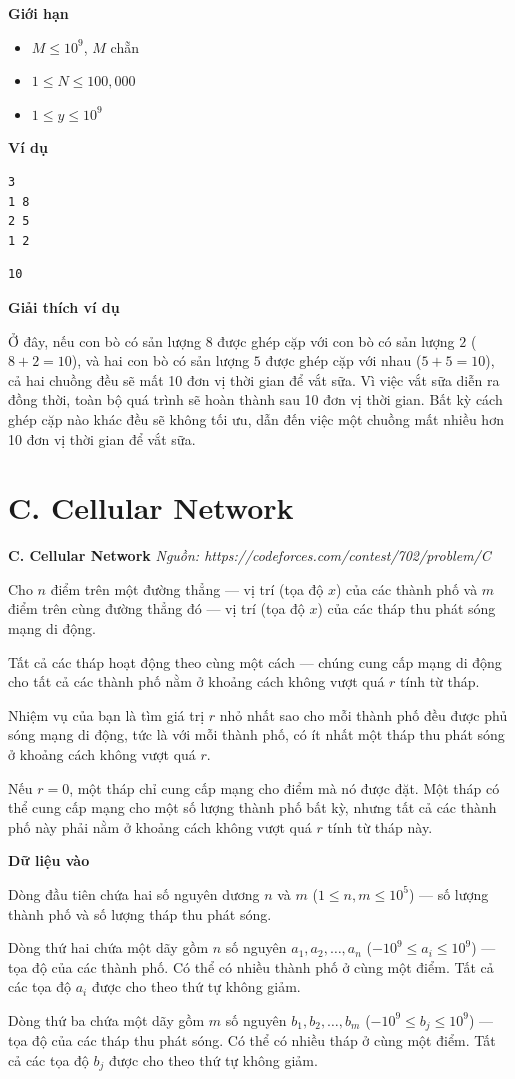 \documentclass[12pt,a4paper]{article}
\newcommand{\problem}[2]{%
  \begin{mdframed}[
    linecolor=framecolor,
    linewidth=1.5pt,
    backgroundcolor=white,
    topline=true, bottomline=true,
    leftline=true, rightline=true,
    innerleftmargin=10pt, innerrightmargin=10pt,
    innertopmargin=6pt, innerbottommargin=6pt,
  ]
  \textbf{\large #1} \hfill \textit{Nguồn: #2}
  \end{mdframed}
  \vspace{4pt}%
}
\newcommand{\inputformat}{%
  \vspace{6pt}\textbf{\textcolor{sectioncolor}{Dữ liệu vào}}\par\vspace{2pt}%
}
\newcommand{\constraints}{%
  \vspace{6pt}\textbf{\textcolor{sectioncolor}{Giới hạn}}\par\vspace{2pt}%
}
\newcommand{\example}{%
  \vspace{6pt}\textbf{\textcolor{sectioncolor}{Ví dụ}}\par\vspace{2pt}%
}
\newcommand{\explanation}{%
  \vspace{6pt}\textbf{\textcolor{sectioncolor}{Giải thích ví dụ}}\par\vspace{2pt}%
}
\begin{document}
\constraints
\begin{constraintbox}
\begin{itemize}
    \item $M \le 10^9$, $M$ chẵn
    \item $1 \le N \le 100,000$
    \item $1 \le y \le 10^9$
\end{itemize}
\end{constraintbox}

\example
\begin{lstlisting}
3
1 8
2 5
1 2
\end{lstlisting}
\begin{lstlisting}
10
\end{lstlisting}

\explanation
Ở đây, nếu con bò có sản lượng $8$ được ghép cặp với con bò có sản lượng $2$ ($8+2=10$), và hai con bò có sản lượng $5$ được ghép cặp với nhau ($5+5=10$), cả hai chuồng đều sẽ mất 10 đơn vị thời gian để vắt sữa. Vì việc vắt sữa diễn ra đồng thời, toàn bộ quá trình sẽ hoàn thành sau 10 đơn vị thời gian. Bất kỳ cách ghép cặp nào khác đều sẽ không tối ưu, dẫn đến việc một chuồng mất nhiều hơn 10 đơn vị thời gian để vắt sữa.


\section{C. Cellular Network}
\problem{C. Cellular Network}{https://codeforces.com/contest/702/problem/C}

Cho $n$ điểm trên một đường thẳng — vị trí (tọa độ $x$) của các thành phố và $m$ điểm trên cùng đường thẳng đó — vị trí (tọa độ $x$) của các tháp thu phát sóng mạng di động.

Tất cả các tháp hoạt động theo cùng một cách — chúng cung cấp mạng di động cho tất cả các thành phố nằm ở khoảng cách không vượt quá $r$ tính từ tháp.

Nhiệm vụ của bạn là tìm giá trị $r$ nhỏ nhất sao cho mỗi thành phố đều được phủ sóng mạng di động, tức là với mỗi thành phố, có ít nhất một tháp thu phát sóng ở khoảng cách không vượt quá $r$.

Nếu $r = 0$, một tháp chỉ cung cấp mạng cho điểm mà nó được đặt. Một tháp có thể cung cấp mạng cho một số lượng thành phố bất kỳ, nhưng tất cả các thành phố này phải nằm ở khoảng cách không vượt quá $r$ tính từ tháp này.

\inputformat
\begin{inputbox}
Dòng đầu tiên chứa hai số nguyên dương $n$ và $m$ ($1 \le n, m \le 10^5$) — số lượng thành phố và số lượng tháp thu phát sóng.

Dòng thứ hai chứa một dãy gồm $n$ số nguyên $a_1, a_2, \dots, a_n$ ($-10^9 \le a_i \le 10^9$) — tọa độ của các thành phố. Có thể có nhiều thành phố ở cùng một điểm. Tất cả các tọa độ $a_i$ được cho theo thứ tự không giảm.

Dòng thứ ba chứa một dãy gồm $m$ số nguyên $b_1, b_2, \dots, b_m$ ($-10^9 \le b_j \le 10^9$) — tọa độ của các tháp thu phát sóng. Có thể có nhiều tháp ở cùng một điểm. Tất cả các tọa độ $b_j$ được cho theo thứ tự không giảm.
\end{inputbox}
\end{document}
